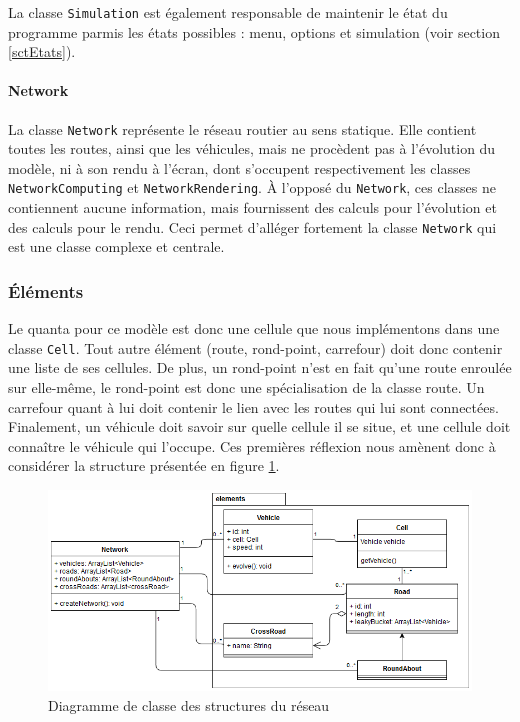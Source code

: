 \documentclass[a4paper,11pt, titlepage]{extarticle}
\begin{document}
La classe \texttt{Simulation} est également responsable de maintenir le état du programme parmis les états possibles : menu, options et simulation (voir section \ref{sctEtats}).

\paragraph{Network}

La classe \texttt{Network} représente le réseau routier au sens statique. Elle contient toutes les routes, ainsi que les véhicules, mais ne procèdent pas à l'évolution du modèle, ni à son rendu à l'écran, dont s'occupent respectivement les classes \texttt{NetworkComputing} et \texttt{NetworkRendering}. À l'opposé du \texttt{Network}, ces classes ne contiennent aucune information, mais fournissent des calculs pour l'évolution et des calculs pour le rendu. Ceci permet d'alléger fortement la classe \texttt{Network} qui est une classe complexe et centrale.

\subsubsection{Éléments}

Le quanta pour ce modèle est donc une cellule que nous implémentons dans une classe \texttt{Cell}. Tout autre élément (route, rond-point, carrefour) doit donc contenir une liste de ses cellules. De plus, un rond-point n'est en fait qu'une route enroulée sur elle-même, le rond-point est donc une spécialisation de la classe route. Un carrefour quant à lui doit contenir le lien avec les routes qui lui sont connectées. Finalement, un véhicule doit savoir sur quelle cellule il se situe, et une cellule doit connaître le véhicule qui l'occupe. Ces premières réflexion nous amènent donc à considérer la structure présentée en figure \ref{imgElements}.

\begin{figure}[!h]
\begin{center}
\includegraphics[width=15cm]{elements_diagram.png}
\caption{Diagramme de classe des structures du réseau}
\label{imgElements}
\end{center}
\end{figure}
\end{document}
